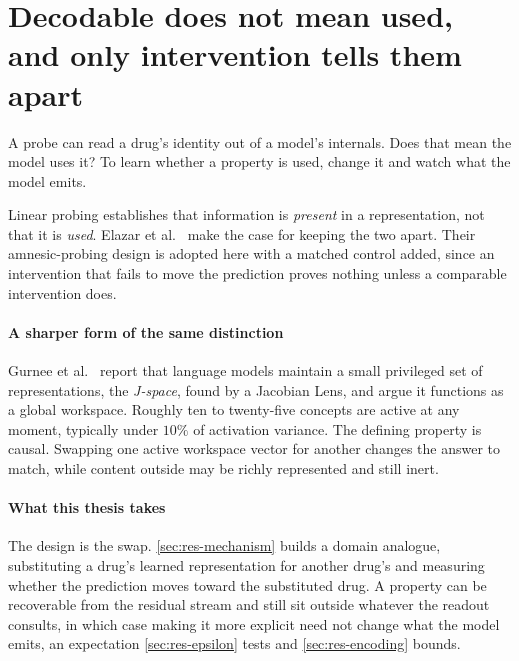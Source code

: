 \section{Decodable does not mean used, and only intervention tells them apart}
\label{sec:lit-interp}
\framedecl{-}

\begin{question}
A probe can read a drug's identity out of a model's internals. Does that mean the
model uses it? To learn whether a property is used, change it and watch what the
model emits.
\end{question}

\noindent
Linear probing establishes that information is \emph{present} in a
representation, not that it is \emph{used}. Elazar et al.~\cite{gurnee} make the
case for keeping the two apart. Their amnesic-probing design is adopted here with
a matched control added, since an intervention that fails to move the prediction
proves nothing unless a comparable intervention does.

\paragraph{A sharper form of the same distinction} Gurnee et al.~\cite{workspace}
report that language models maintain a small privileged set of representations,
the \emph{J-space}, found by a Jacobian Lens, and argue it functions as a global
workspace. Roughly ten to twenty-five concepts are active at any moment,
typically under $10\%$ of activation variance. The defining property is causal.
Swapping one active
workspace vector for another changes the answer to match, while content outside
may be richly represented and still inert.

\paragraph{What this thesis takes} The design is the swap.
\cref{sec:res-mechanism} builds a domain analogue, substituting a drug's learned
representation for another drug's and measuring whether the prediction moves
toward the substituted drug. A property can be recoverable from the residual
stream and still sit outside whatever the readout consults, in which case making
it more explicit need not change what the model emits, an expectation
\cref{sec:res-epsilon} tests and \cref{sec:res-encoding} bounds.

